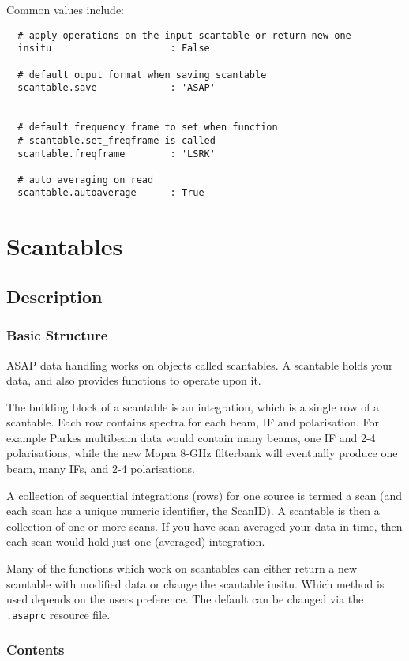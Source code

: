 \documentclass[11pt]{article}
\begin{document}
Common values include:
\begin{verbatim}
  # apply operations on the input scantable or return new one
  insitu                     : False

  # default ouput format when saving scantable
  scantable.save             : 'ASAP'


  # default frequency frame to set when function
  # scantable.set_freqframe is called
  scantable.freqframe        : 'LSRK'

  # auto averaging on read
  scantable.autoaverage      : True
\end{verbatim}

\section{Scantables}

\subsection {Description}

\subsubsection {Basic Structure}

ASAP data handling works on objects called scantables.  A scantable
holds your data, and also provides functions to operate
upon it.

The building block of a scantable is an integration, which is a single
row of a scantable. Each row contains spectra for each beam, IF and
polarisation. For example Parkes multibeam data would contain many
beams, one IF and 2-4 polarisations, while the new Mopra 8-GHz
filterbank will eventually produce one beam, many IFs, and 2-4
polarisations.

A collection of sequential integrations (rows) for one source is termed
a scan (and each scan has a unique numeric identifier, the ScanID). A
scantable is then a collection  of one or more scans. If you have
scan-averaged your data in time, then each scan would  hold just one
(averaged) integration.

Many of the functions which work on scantables can either return a
new scantable with modified data or change the scantable insitu. Which
method is used depends on the users preference. The default can be
changed via the {\tt .asaprc} resource file.

\subsubsection {Contents}
\end{document}
